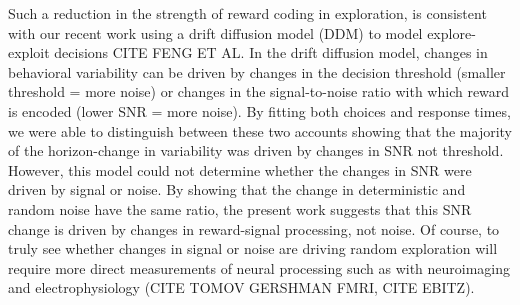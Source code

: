 \documentclass[12pt]{article}
\begin{document}
    Such a reduction in the strength of reward coding in exploration, is consistent with our recent work using a drift diffusion model (DDM) to model explore-exploit decisions CITE FENG ET AL. In the drift diffusion model, changes in behavioral variability can be driven by changes in the decision threshold (smaller threshold = more noise) or changes in the signal-to-noise ratio with which reward is encoded (lower SNR = more noise). By fitting both choices and response times, we were able to distinguish between these two accounts showing that the majority of the horizon-change in variability was driven by changes in SNR not threshold.  However, this model could not determine whether the changes in SNR were driven by signal or noise. By showing that the change in deterministic and random noise have the same ratio, the present work suggests that this SNR change is driven by changes in reward-signal processing, not noise. Of course, to truly see whether changes in signal or noise are driving random exploration will require more direct measurements of neural processing such as with neuroimaging and electrophysiology (CITE TOMOV GERSHMAN FMRI, CITE EBITZ).

    


    
    
    
\end{document}
